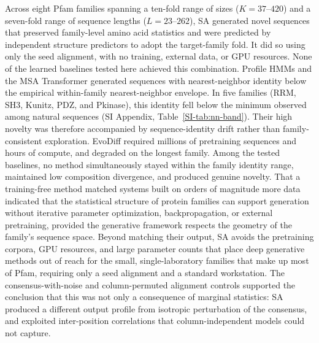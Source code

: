 \documentclass[11pt,onecolumn,twoside,lineno]{pnas-new}
\begin{document}
Across eight Pfam families spanning a ten-fold range of sizes ($K{=}37$--$420$) and a seven-fold range of sequence lengths ($L{=}23$--$262$), SA generated novel sequences that preserved family-level amino acid statistics and were predicted by independent structure predictors to adopt the target-family fold. It did so using only the seed alignment, with no training, external data, or GPU resources. None of the learned baselines tested here achieved this combination. Profile HMMs and the MSA Transformer generated sequences with nearest-neighbor identity below the empirical within-family nearest-neighbor envelope. In five families (RRM, SH3, Kunitz, PDZ, and Pkinase), this identity fell below the minimum observed among natural sequences (SI Appendix, Table~\ref{SI-tab:nn-band}). Their high novelty was therefore accompanied by sequence-identity drift rather than family-consistent exploration. EvoDiff required millions of pretraining sequences and hours of compute, and degraded on the longest family. Among the tested baselines, no method simultaneously stayed within the family identity range, maintained low composition divergence, and produced genuine novelty. That a training-free method matched systems built on orders of magnitude more data indicated that the statistical structure of protein families can support generation without iterative parameter optimization, backpropagation, or external pretraining, provided the generative framework respects the geometry of the family's sequence space. Beyond matching their output, SA avoids the pretraining corpora, GPU resources, and large parameter counts that place deep generative methods out of reach for the small, single-laboratory families that make up most of Pfam, requiring only a seed alignment and a standard workstation. The consensus-with-noise and column-permuted alignment controls supported the conclusion that this was not only a consequence of marginal statistics: SA produced a different output profile from isotropic perturbation of the consensus, and exploited inter-position correlations that column-independent models could not capture.
\end{document}
